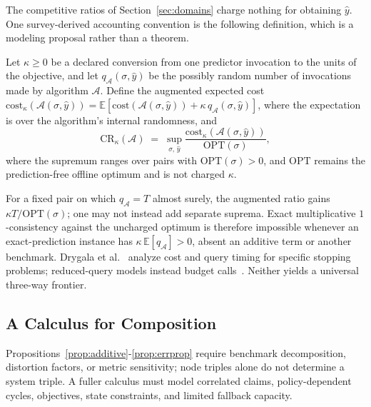 \documentclass[acmsmall,screen,nonacm]{acmart}
\theoremstyle{acmdefinition}%
\begin{document}
The competitive ratios of Section~\ref{sec:domains} charge nothing for obtaining $\hat y$. One survey-derived accounting convention is the following definition, which is a modeling proposal rather than a theorem.

\begin{definition}
\label{def:kappa_cr}
Let $\kappa \geq 0$ be a declared conversion from one predictor invocation to the units of the objective, and let $q_{\mathcal A}(\sigma,\hat y)$ be the possibly random number of invocations made by algorithm $\mathcal{A}$. Define the augmented expected cost
$\mathrm{cost}_\kappa(\mathcal{A}(\sigma,\hat y)) = \mathbb E[\mathrm{cost}(\mathcal{A}(\sigma,\hat y)) + \kappa\, q_{\mathcal A}(\sigma,\hat y)]$, where the expectation is over the algorithm's internal randomness, and
\begin{equation}
    \mathrm{CR}_\kappa(\mathcal{A}) \;=\; \sup_{\sigma,\,\hat y} \frac{\mathrm{cost}_\kappa(\mathcal{A}(\sigma, \hat y))}{\mathrm{OPT}(\sigma)},
    \label{eq_kappa_cr}
\end{equation}
where the supremum ranges over pairs with $\mathrm{OPT}(\sigma)>0$, and $\mathrm{OPT}$ remains the prediction-free offline optimum and is not charged $\kappa$.
\end{definition}

For a fixed pair on which $q_{\mathcal A}=T$ almost surely, the augmented ratio gains $\kappa T/\mathrm{OPT}(\sigma)$; one may not instead add separate suprema. Exact multiplicative $1$-consistency against the uncharged optimum is therefore impossible whenever an exact-prediction instance has $\kappa\,\mathbb E[q_{\mathcal A}]>0$, absent an additive term or another benchmark. Drygala et al.~\cite{drygala2023costly} analyze cost and query timing for specific stopping problems; reduced-query models instead budget calls~\cite{im2022parsimonious,sadek2024reduced}. Neither yields a universal three-way frontier.

\subsection{A Calculus for Composition}
\label{subsec:compose_open}

Propositions~\ref{prop:additive}-\ref{prop:errprop} require benchmark decomposition, distortion factors, or metric sensitivity; node triples alone do not determine a system triple. A fuller calculus must model correlated claims, policy-dependent cycles, objectives, state constraints, and limited fallback capacity.
\end{document}
